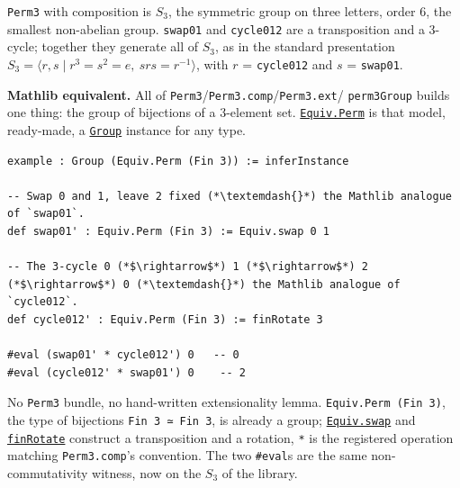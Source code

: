 \begin{mathreading}

\texttt{Perm3} with composition is \(S_3\), the symmetric group on three letters, order \(6\), the smallest non-abelian group. \texttt{swap01} and \texttt{cycle012} are a transposition and a 3-cycle; together they generate all of \(S_3\), as in the standard presentation \(S_3 = \langle r, s \mid r^3 = s^2 = e,\ srs = r^{-1} \rangle\), with \(r\) = \texttt{cycle012} and \(s\) = \texttt{swap01}.

\end{mathreading}

\textbf{Mathlib equivalent.} All of \texttt{Perm3}/\texttt{Perm3.comp}/\texttt{Perm3.ext}/ \texttt{perm3Group} builds one thing: the group of bijections of a 3-element set. \href{https://loogle.lean-lang.org/?q=Equiv.Perm}{\texttt{Equiv.Perm}} is that model, ready-made, a \href{https://loogle.lean-lang.org/?q=Group}{\texttt{Group}} instance for any type.

\begin{lstlisting}
example : Group (Equiv.Perm (Fin 3)) := inferInstance

-- Swap 0 and 1, leave 2 fixed (*\textemdash{}*) the Mathlib analogue of `swap01`.
def swap01' : Equiv.Perm (Fin 3) := Equiv.swap 0 1

-- The 3-cycle 0 (*$\rightarrow$*) 1 (*$\rightarrow$*) 2 (*$\rightarrow$*) 0 (*\textemdash{}*) the Mathlib analogue of `cycle012`.
def cycle012' : Equiv.Perm (Fin 3) := finRotate 3

#eval (swap01' * cycle012') 0   -- 0
#eval (cycle012' * swap01') 0    -- 2
\end{lstlisting}

No \texttt{Perm3} bundle, no hand-written extensionality lemma. \texttt{Equiv.Perm (Fin 3)}, the type of bijections \texttt{Fin 3 ≃ Fin 3}, is already a group; \href{https://loogle.lean-lang.org/?q=Equiv.swap}{\texttt{Equiv.swap}} and \href{https://loogle.lean-lang.org/?q=finRotate}{\texttt{finRotate}} construct a transposition and a rotation, \texttt{*} is the registered operation matching \texttt{Perm3.comp}'s convention. The two \texttt{\#eval}s are the same non-commutativity witness, now on the \(S_3\) of the library.


